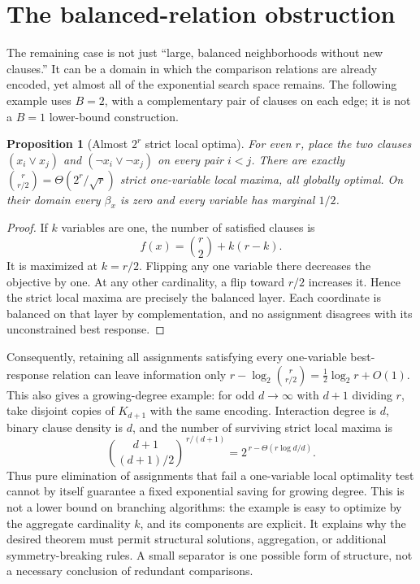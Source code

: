 \documentclass[11pt,a4paper]{article}
\newtheorem{proposition}[theorem]{Proposition}
\theoremstyle{definition}
\theoremstyle{remark}
\begin{document}
\section{The balanced-relation obstruction}
\label{sec:stable}

The remaining case is not just ``large, balanced neighborhoods without
new clauses.'' It can be a domain in which the comparison relations are
already encoded, yet almost all of the exponential search space remains.
The following example uses $B=2$, with a complementary pair of clauses
on each edge; it is not a $B=1$ lower-bound construction.

\begin{proposition}[Almost $2^r$ strict local optima]\label{prop:stable}
For even $r$, place the two clauses
$(x_i\vee x_j)$ and $(\neg x_i\vee\neg x_j)$ on every pair $i<j$.
There are exactly $\binom r{r/2}=\Theta(2^r/\sqrt r)$ strict
one-variable local maxima, all globally optimal. On their domain every
$\beta_x$ is zero and every variable has marginal $1/2$.
\end{proposition}
\begin{proof}
If $k$ variables are one, the number of satisfied clauses is
\[
 f(x)=\binom r2+k(r-k).
\]
It is maximized at $k=r/2$. Flipping any one variable there decreases
the objective by one. At any other cardinality, a flip toward $r/2$
increases it. Hence the strict local maxima are precisely the balanced
layer. Each coordinate is balanced on that layer by complementation,
and no assignment disagrees with its unconstrained best response.
\end{proof}

Consequently, retaining all assignments satisfying every one-variable
best-response relation can leave information only
$r-\log_2\binom r{r/2}=\tfrac12\log_2 r+O(1)$.
This also gives a growing-degree example: for odd $d\to\infty$ with
$d+1$ dividing $r$, take disjoint copies of $K_{d+1}$ with the same
encoding. Interaction degree is $d$, binary clause density is $d$, and
the number of surviving strict local maxima is
\[
 \binom{d+1}{(d+1)/2}^{\,r/(d+1)}
   =2^{\,r-\Theta(r\log d/d)}.
\]
Thus pure elimination of assignments that fail a one-variable local
optimality test cannot by itself guarantee a fixed exponential saving
for growing degree. This is not a lower bound on branching algorithms:
the example is easy to optimize by the aggregate cardinality $k$, and
its components are explicit. It explains why the desired theorem must
permit structural solutions, aggregation, or additional symmetry-breaking
rules. A small separator is one possible form of structure, not a
necessary conclusion of redundant comparisons.
\end{document}

